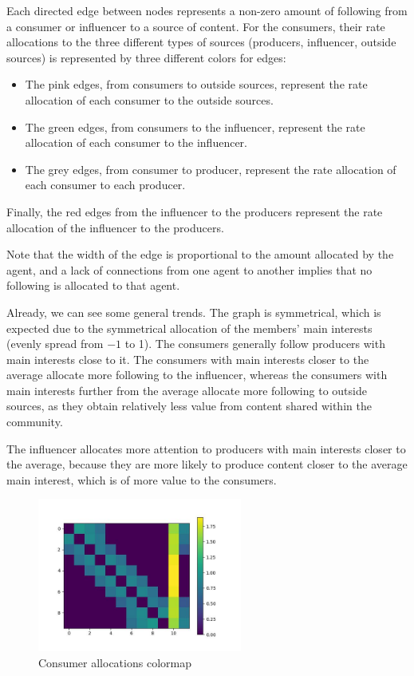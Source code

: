 \documentclass[11pt, letterpaper]{article}
\begin{document}
Each directed edge between nodes represents a non-zero amount of following from a consumer or influencer to a source of content. For the consumers, their rate allocations to the three different types of sources (producers, influencer, outside sources) is represented by three different colors for edges:
\begin{itemize}
    \item The pink edges, from consumers to outside sources, represent the rate allocation of each consumer to the outside sources.
    \item The green edges, from consumers to the influencer, represent the rate allocation of each consumer to the influencer.
    \item The grey edges, from consumer to producer, represent the rate allocation of each consumer to each producer.
\end{itemize}
Finally, the red edges from the influencer to the producers represent the rate allocation of the influencer to the producers.

Note that the width of the edge is proportional to the amount allocated by the agent, and a lack of connections from one agent to another implies that no following is allocated to that agent.

Already, we can see some general trends. The graph is symmetrical, which is expected due to the symmetrical allocation of the members' main interests (evenly spread from \(-1\) to 1). The consumers generally follow producers with main interests close to it. The consumers with main interests closer to the average allocate more following to the influencer, whereas the consumers with main interests further from the average allocate more following to outside sources, as they obtain relatively less value from content shared within the community.

The influencer allocates more attention to producers with main interests closer to the average, because they are more likely to produce content closer to the average main interest, which is of more value to the consumers.

\begin{figure}[h]
    \centering
    \includegraphics[width=0.6\textwidth]{figures/2D_perfect.jpg}
    \caption{Consumer allocations colormap}
    \label{fig:default_colormap}
\end{figure}
\end{document}
